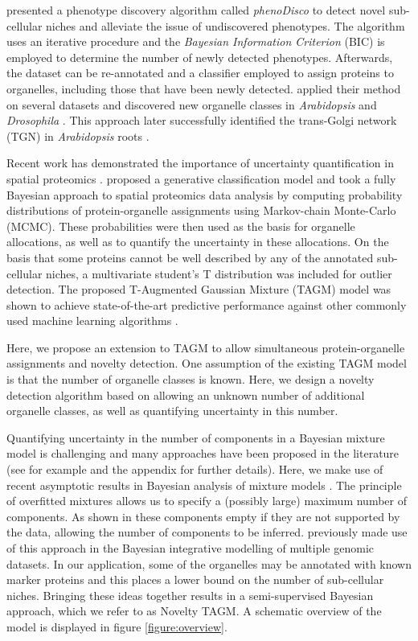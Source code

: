 \documentclass[12pt,english]{article}
\begin{document}
\cite{Breckels:2013} presented a phenotype discovery algorithm called \textit{phenoDisco} to detect novel sub-cellular niches and alleviate the issue of undiscovered phenotypes. The algorithm uses an iterative procedure and the \textit{Bayesian Information Criterion} (BIC) \citep{Schwarz::1978} is employed to determine the number of newly detected phenotypes. Afterwards, the dataset can be re-annotated and a classifier employed to assign proteins to organelles, including those that have been newly detected. \cite{Breckels:2013} applied their method on several datasets and discovered new organelle classes in \textit{Arabidopsis} \citep{Dunkley:2006} and \textit{Drosophila} \citep{Tan:2009}. This approach later successfully identified the trans-Golgi network (TGN) in \textit{Arabidopsis} roots \citep{Groen:2014}.

Recent work has demonstrated the importance of uncertainty quantification in spatial proteomics \citep{Crook:2018,Crook::2019b, Crook::2019a}. \cite{Crook:2018} proposed a generative classification model and took a fully Bayesian approach to spatial proteomics data analysis by computing probability distributions of protein-organelle assignments using Markov-chain Monte-Carlo (MCMC). These probabilities were then used as the basis for organelle allocations, as well as to quantify the uncertainty in these allocations. On the basis that some proteins cannot be well described by any of the annotated sub-cellular niches, a multivariate student's T distribution was included for outlier detection. The proposed T-Augmented Gaussian Mixture (TAGM) model was shown to achieve state-of-the-art predictive performance against other commonly used machine learning algorithms \citep{Crook:2018}. 

Here, we propose an extension to TAGM to allow simultaneous protein-organelle assignments and novelty detection. One assumption of the existing TAGM model is that the number of organelle classes is known. Here, we design a novelty detection algorithm based on allowing an unknown number of additional organelle classes, as well as quantifying uncertainty in this number.

Quantifying uncertainty in the number of components in a Bayesian mixture model is challenging and many approaches have been proposed in the literature (see for example \cite{ferguson::1974, antoniak::1974, Richardson::1997} and the appendix for further details). Here, we make use of recent asymptotic results in Bayesian analysis of mixture models \citep{Rousseau::2011}. The principle of overfitted mixtures allows us to specify a (possibly large) maximum number of components. As shown in \cite{Rousseau::2011} these components empty if they are not supported by the data, allowing the number of components to be inferred. \cite{Kirk:2012} previously made use of this approach in the Bayesian integrative modelling of multiple genomic datasets. In our application, some of the organelles may be annotated with known marker proteins and this places a lower bound on the number of sub-cellular niches. Bringing these ideas together results in a semi-supervised Bayesian approach, which we refer to as Novelty TAGM. A schematic overview of the model is displayed in figure \ref{figure:overview}. 
\end{document}
